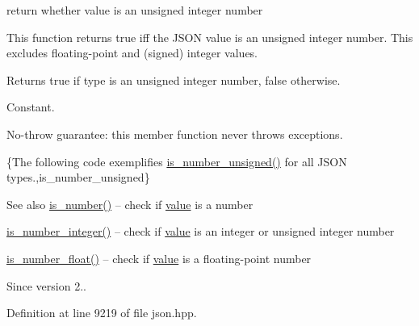 return whether value is an unsigned integer number 

This function returns true iff the J\+S\+ON value is an unsigned integer number. This excludes floating-\/point and (signed) integer values.

\begin{DoxyReturn}{Returns}
{\ttfamily true} if type is an unsigned integer number, {\ttfamily false} otherwise.
\end{DoxyReturn}
Constant.

No-\/throw guarantee\+: this member function never throws exceptions.

\{The following code exemplifies {\ttfamily \hyperlink{classnlohmann_1_1basic__json_abc7378cba0613a78b9aad1c8e7044bb0}{is\+\_\+number\+\_\+unsigned()}} for all J\+S\+ON types.,is\+\_\+number\+\_\+unsigned\}

\begin{DoxySeeAlso}{See also}
\hyperlink{classnlohmann_1_1basic__json_a2b9852390abb4b1ef5fac6984e2fc0f3}{is\+\_\+number()} -- check if \hyperlink{classnlohmann_1_1basic__json_a9fa223b26419f018f9b18cc516e3a8e5}{value} is a number 

\hyperlink{classnlohmann_1_1basic__json_abac8af76067f1e8fdca9052882c74428}{is\+\_\+number\+\_\+integer()} -- check if \hyperlink{classnlohmann_1_1basic__json_a9fa223b26419f018f9b18cc516e3a8e5}{value} is an integer or unsigned integer number 

\hyperlink{classnlohmann_1_1basic__json_a33b4bf898b857c962e798fc7f6e86e70}{is\+\_\+number\+\_\+float()} -- check if \hyperlink{classnlohmann_1_1basic__json_a9fa223b26419f018f9b18cc516e3a8e5}{value} is a floating-\/point number
\end{DoxySeeAlso}
\begin{DoxySince}{Since}
version 2.. 
\end{DoxySince}


Definition at line 9219 of file json.\+hpp.

